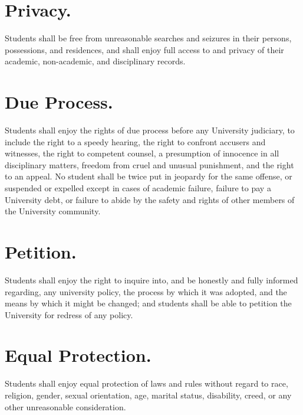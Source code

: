 \section{Privacy.}
    Students shall be free from unreasonable searches and seizures in their persons, possessions, and residences, and shall enjoy full access to and privacy of their academic, non-academic, and disciplinary records.

\section{Due Process.}
    Students shall enjoy the rights of due process before any University judiciary, to include the right to a speedy hearing, the right to confront accusers and witnesses, the right to competent counsel, a presumption of innocence in all disciplinary matters, freedom from cruel and unusual punishment, and the right to an appeal. No student shall be twice put in jeopardy for the same offense, or suspended or expelled except in cases of academic failure, failure to pay a University debt, or failure to abide by the safety and rights of other members of the University community.

\section{Petition.}
    Students shall enjoy the right to inquire into, and be honestly and fully informed regarding, any university policy, the process by which it was adopted, and the means by which it might be changed; and students shall be able to petition the University for redress of any policy.

\section{Equal Protection.}
    Students shall enjoy equal protection of laws and rules without regard to race, religion, gender, sexual orientation, age, marital status, disability, creed, or any other unreasonable consideration.